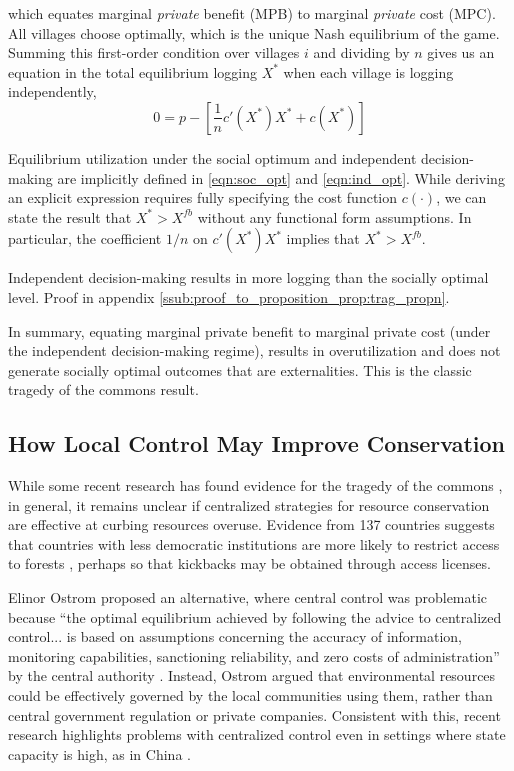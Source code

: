 \documentclass[12pt,reqno]{article}
\begin{document}
\noindent which equates marginal \emph{private} benefit (MPB) to marginal \emph{private} cost (MPC). All villages choose optimally, which is the unique Nash equilibrium of the game. Summing this first-order condition over villages $i$ and dividing by $n$ gives us an equation in the total equilibrium logging $X^*$ when each village is logging independently,
\begin{equation}
0 = p - \left[ \frac{1}{n} c'(X^*) X^* + c(X^*) \right]
\label{eqn:ind_opt}
\end{equation}

Equilibrium utilization under the social optimum and independent decision-making are implicitly defined in \ref{eqn:soc_opt} and \ref{eqn:ind_opt}. While deriving an explicit expression requires fully specifying the cost function $c(\cdot)$, we can state the result that $X^* > X^{fb}$ without any functional form assumptions. In particular, the coefficient $1/n$ on $c'(X^*)X^*$ implies that $X^* >
X^{fb}$.

\begin{propn}[$X^* > X^{fb}$]\label{prop:trag_propn} Independent decision-making results in more logging than the socially optimal level.
Proof in appendix \ref{ssub:proof_to_proposition_prop:trag_propn}.
\end{propn}

In summary, equating marginal private benefit to marginal private cost (under the independent decision-making regime), results in overutilization and does not generate socially optimal outcomes that are externalities. This is the classic tragedy of the commons result.

\subsection{How Local Control May Improve Conservation}

While some recent research has found evidence for the tragedy of the commons \parencite{lopez1998tragedy}, in general, it remains unclear if centralized strategies for resource conservation are effective at curbing resources overuse. Evidence from 137 countries suggests that countries with less democratic institutions are more likely to restrict access to forests \parencite{kashwan2017inequality}, perhaps so that kickbacks may be obtained through access licenses. 

Elinor Ostrom proposed an alternative, where central control was problematic because ``the optimal equilibrium achieved by following the advice to centralized control... is based on assumptions concerning the accuracy of information, monitoring capabilities, sanctioning reliability, and zero costs of administration'' by the central authority \parencite[10]{ostrom1990governing}. Instead, Ostrom argued that environmental resources could be effectively governed by the local communities using them, rather than central government regulation or private companies. Consistent with this, recent research highlights problems with centralized control even in settings where state capacity is high, as in China \parencite{anderson2019non}.  
\end{document}
